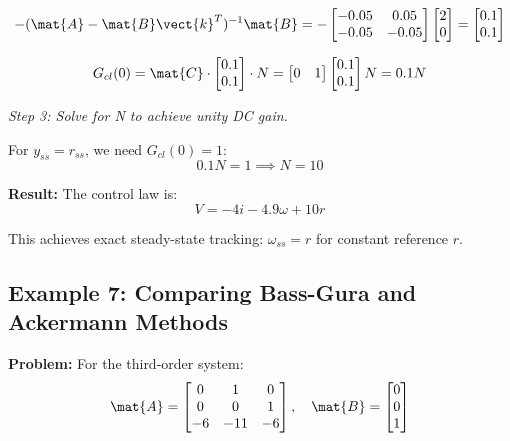 \begin{equation}
-(\mat{A} - \mat{B}\vect{k}^T)^{-1}\mat{B} = -\begin{bmatrix} -0.05 & 0.05 \\ -0.05 & -0.05 \end{bmatrix}
\begin{bmatrix} 2 \\ 0 \end{bmatrix}
= \begin{bmatrix} 0.1 \\ 0.1 \end{bmatrix}
\end{equation}

\begin{equation}
G_{cl}(0) = \mat{C} \cdot \begin{bmatrix} 0.1 \\ 0.1 \end{bmatrix} \cdot N
= \begin{bmatrix} 0 & 1 \end{bmatrix}\begin{bmatrix} 0.1 \\ 0.1 \end{bmatrix} N = 0.1N
\end{equation}

\textit{Step 3: Solve for N to achieve unity DC gain.}

For $y_{ss} = r_{ss}$, we need $G_{cl}(0) = 1$:
\begin{equation}
0.1N = 1 \implies N = 10
\end{equation}

\textbf{Result:} The control law is:
\begin{equation}
V = -4i - 4.9\omega + 10r
\end{equation}

This achieves exact steady-state tracking: $\omega_{ss} = r$ for constant reference $r$.

\subsection{Example 7: Comparing Bass-Gura and Ackermann Methods}

\textbf{Problem:} For the third-order system:
\begin{equation}
\mat{A} = \begin{bmatrix} 0 & 1 & 0 \\ 0 & 0 & 1 \\ -6 & -11 & -6 \end{bmatrix}, \quad
\mat{B} = \begin{bmatrix} 0 \\ 0 \\ 1 \end{bmatrix}
\end{equation}

